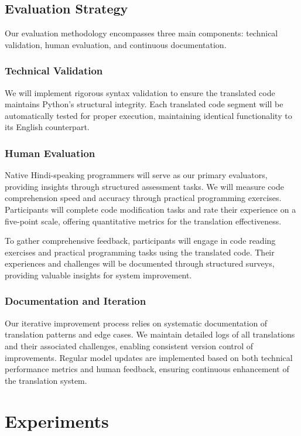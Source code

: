 \documentclass[9pt]{papertex}
\begin{document}
\subsection{Evaluation Strategy}

Our evaluation methodology encompasses three main components: technical validation, human evaluation, and continuous documentation.

\subsubsection{Technical Validation}
We will implement rigorous syntax validation to ensure the translated code maintains Python's structural integrity. Each translated code segment will be automatically tested for proper execution, maintaining identical functionality to its English counterpart.

\subsubsection{Human Evaluation}
Native Hindi-speaking programmers will serve as our primary evaluators, providing insights through structured assessment tasks. We will measure code comprehension speed and accuracy through practical programming exercises. Participants will complete code modification tasks and rate their experience on a five-point scale, offering quantitative metrics for the translation effectiveness.

To gather comprehensive feedback, participants will engage in code reading exercises and practical programming tasks using the translated code. Their experiences and challenges will be documented through structured surveys, providing valuable insights for system improvement.

\subsubsection{Documentation and Iteration}
Our iterative improvement process relies on systematic documentation of translation patterns and edge cases. We maintain detailed logs of all translations and their associated challenges, enabling consistent version control of improvements. Regular model updates are implemented based on both technical performance metrics and human feedback, ensuring continuous enhancement of the translation system.
\section{Experiments}
\end{document}
